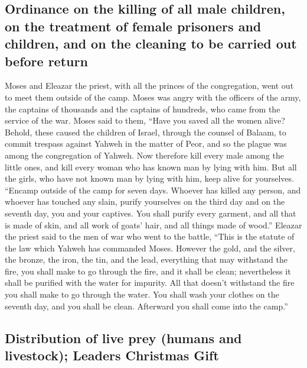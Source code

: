 \hypertarget{ordinance-on-the-killing-of-all-male-children-on-the-treatment-of-female-prisoners-and-children-and-on-the-cleaning-to-be-carried-out-before-return}{%
\subsection{Ordinance on the killing of all male children, on the
treatment of female prisoners and children, and on the cleaning to be
carried out before
return}\label{ordinance-on-the-killing-of-all-male-children-on-the-treatment-of-female-prisoners-and-children-and-on-the-cleaning-to-be-carried-out-before-return}}

 Moses and Eleazar the priest, with all the princes of
the congregation, went out to meet them outside of the camp.
 Moses was angry with the officers of the army, the
captains of thousands and the captains of hundreds, who came from the
service of the war.  Moses said to them, ``Have you saved
all the women alive?  Behold, these caused the children
of Israel, through the counsel of Balaam, to commit trespass against
Yahweh in the matter of Peor, and so the plague was among the
congregation of Yahweh.  Now therefore kill every male
among the little ones, and kill every woman who has known man by lying
with him.  But all the girls, who have not known man by
lying with him, keep alive for yourselves.  ``Encamp
outside of the camp for seven days. Whoever has killed any person, and
whoever has touched any slain, purify yourselves on the third day and on
the seventh day, you and your captives.  You shall purify
every garment, and all that is made of skin, and all work of goats'
hair, and all things made of wood.''  Eleazar the priest
said to the men of war who went to the battle, ``This is the statute of
the law which Yahweh has commanded Moses.  However the
gold, and the silver, the bronze, the iron, the tin, and the lead,
 everything that may withstand the fire, you shall make
to go through the fire, and it shall be clean; nevertheless it shall be
purified with the water for impurity. All that doesn't withstand the
fire you shall make to go through the water.  You shall
wash your clothes on the seventh day, and you shall be clean. Afterward
you shall come into the camp.''

\hypertarget{distribution-of-live-prey-humans-and-livestock-leaders-christmas-gift}{%
\subsection{Distribution of live prey (humans and livestock); Leaders
Christmas
Gift}\label{distribution-of-live-prey-humans-and-livestock-leaders-christmas-gift}}

